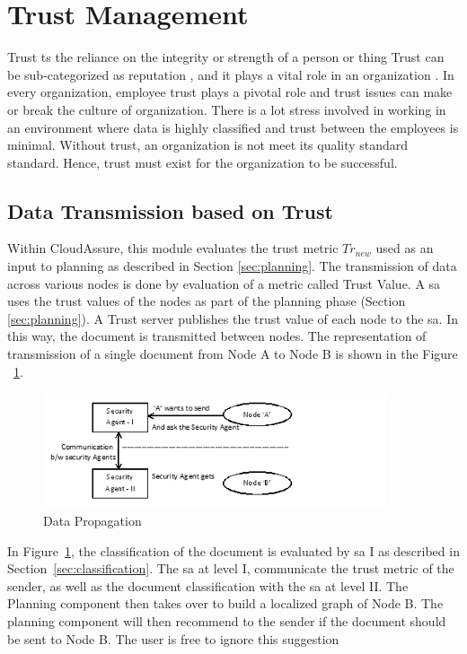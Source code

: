 \section{Trust Management}
\label{sec:trust-management}
Trust ts the reliance on the integrity or strength of a person or thing
\autocite{Dictionary2013} Trust can be sub-categorized as reputation
, and it plays a vital role in an organization \autocite{Liu2006}. In every organization, employee trust plays
a pivotal role and trust issues can make or break the culture of organization. There is a
lot stress involved in working in an environment where data is highly classified and trust
between the employees is minimal. Without trust, an organization is not meet its
quality standard standard. Hence, trust must exist for the organization to be successful.

\subsection{Data Transmission based on Trust}
Within CloudAssure, this module evaluates the trust metric \( Tr_{new} \) used
as an input to planning as described in Section \ref{sec:planning}. The transmission of data across various
nodes is done by evaluation of a metric called Trust Value. A \gls{sa} 
uses the trust values of the nodes as part of the planning phase (Section
\ref{sec:planning}). A Trust server publishes the trust value of each node to
the \gls{sa}. In this way, the document is transmitted between
nodes. The representation of transmission of a single document from Node A to Node B is
shown in the Figure ~\ref{fig:DataTransmission}.
\begin{figure}[h!]
    \begin{center}
        \includegraphics[width=0.90\textwidth]{Figures/figure1.png}
        \caption{Data Propagation}
        \label{fig:DataTransmission}
    \end{center}
\end{figure}


In Figure~\ref{fig:DataTransmission}, the classification of the document
is evaluated by \gls{sa} I as described in Section~\ref{sec:classification}. 
The \gls{sa} at level I, communicate the trust metric of the sender, as well as
the document classification with the \gls{sa} at level II. The Planning
component then takes over to build a localized graph of Node B. The planning
component will then recommend to the sender if the document should be sent to
Node B. The user is free to ignore this suggestion

